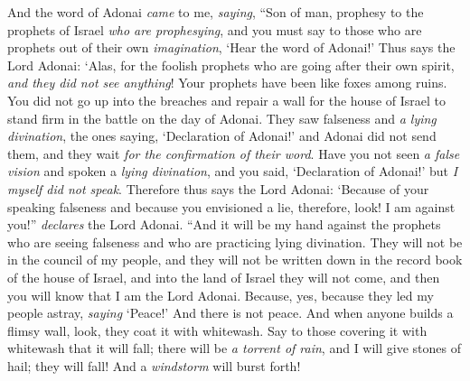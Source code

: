 \begin{biblechapter} %
 And the word of Adonai \textit{came} to me, \textit{saying},
\verse “Son of man, prophesy to the prophets of Israel \textit{who are prophesying}, and you must say to those who are prophets out of their own \textit{imagination}, ‘Hear the word of Adonai!’
\verse Thus says the Lord Adonai: ‘Alas, for the foolish prophets who are going after their own spirit, \textit{and they did not see anything}!
\verse Your prophets have been like foxes among ruins.
\verse You did not go up into the breaches and repair a wall for the house of Israel to stand firm in the battle on the day of Adonai.
\verse They saw falseness and \textit{a lying divination}, the ones saying, ‘Declaration of Adonai!’ and Adonai did not send them, and they wait \textit{for the confirmation of their word}.
\verse Have you not seen \textit{a false vision} and spoken a \textit{lying divination}, and you said, ‘Declaration of Adonai!’ but \textit{I myself did not speak}.
\verse Therefore thus says the Lord Adonai: ‘Because of your speaking falseness and because you envisioned a lie, therefore, look! I am against you!” \textit{declares} the Lord Adonai.
\verse “And it will be my hand against the prophets who are seeing falseness and who are practicing lying divination. They will not be in the council of my people, and they will not be written down in the record book of the house of Israel, and into the land of Israel they will not come, and then you will know that I am the Lord Adonai.
\verse Because, yes, because they led my people astray, \textit{saying} ‘Peace!’ And there is not peace. And when anyone builds a flimsy wall, look, they coat it with whitewash.
\verse Say to those covering it with whitewash that it will fall; there will be \textit{a torrent of rain}, and I will give stones of hail; they will fall!  And a \textit{windstorm} will burst forth!

\end{biblechapter}
